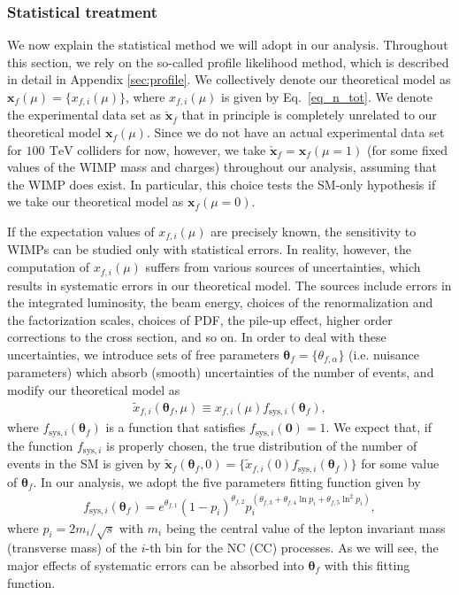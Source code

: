\documentclass[12pt,twoside,book]{article}
\begin{document}
\subsubsection{Statistical treatment}
\label{sec_statistical}

We now explain the statistical method we will adopt in our analysis.
Throughout this section, we rely on the so-called profile likelihood method, which is described in detail in Appendix \ref{sec:profile}.
We collectively denote our theoretical model as $\bm{x}_f(\mu) = \{ x_{f,i} (\mu) \}$, where $x_{f,i}(\mu)$ is given by Eq.~\eqref{eq_n_tot}.
We denote the experimental data set as $\check{\bm{x}}_f$ that in principle is completely unrelated to our theoretical model $\bm{x}_f(\mu)$.
Since we do not have an actual experimental data set for $100~\,\mathrm{TeV}$ colliders for now, however, we take $\check{\bm{x}}_f = \bm{x}_f(\mu = 1)$ (for some fixed values of the WIMP mass and charges) throughout our analysis, assuming that the WIMP does exist.  In particular, this choice tests the SM-only hypothesis if we take our theoretical model as $\bm{x}_f(\mu=0)$.

If the expectation values of $x_{f,i} (\mu)$ are precisely known, the sensitivity to WIMPs can be studied only with statistical errors.
In reality, however, the computation of $x_{f,i} (\mu)$ suffers from various sources of uncertainties, which results in systematic errors in our theoretical model.
The sources include errors in the integrated luminosity, the beam energy, choices of the renormalization and the factorization scales, choices of PDF, the pile-up effect, higher order corrections to the cross section, and so on.
In order to deal with these uncertainties, we introduce sets of free parameters $\bm{\theta}_f = \{ \theta_{f,\alpha} \}$ (i.e. nuisance parameters) which absorb (smooth) uncertainties of the number of events, and modify our theoretical model as
\begin{align}
  \tilde{x}_{f,i} (\bm{\theta}_f, \mu) \equiv x_{f,i} (\mu)
  f_{\mathrm{sys}, i}(\bm{\theta}_f),\label{eq_xtilde}
\end{align}
where $f_{\mathrm{sys}, i}(\bm{\theta}_f)$ is a function that satisfies $f_{\mathrm{sys}, i}(\bm{0}) =1$.
We expect that, if the function $f_{\mathrm{sys}, i}$ is properly chosen, the true distribution of the number of events in the SM is given by $\tilde{\bm{x}}_f (\bm{\theta}_f,0) = \{ \tilde{x}_{f,i} (0) f_{\mathrm{sys}, i}(\bm{\theta}_f)\}$ for some value of $\bm{\theta}_f$.
In our analysis, we adopt the five parameters fitting function given by~\cite{Aaltonen:2008dn}
\begin{align}
  f_{\mathrm{sys}, i} (\bm{\theta}_f) =
  e^{\theta_{f,1}} (1 - p_i)^{\theta_{f,2}}
  p_i^{(\theta_{f,3} + \theta_{f,4} \ln p_i + \theta_{f,5} \ln^2 p_i)},
  \label{eq_f_theta}
\end{align}
where $p_i = 2m_{i} / \sqrt{s}$ with $m_i$ being the central value of the lepton invariant mass (transverse mass) of the $i$-th bin for the NC (CC) processes.
As we will see, the major effects of systematic errors can be absorbed into $\bm{\theta}_f$ with this fitting function.
\end{document}
